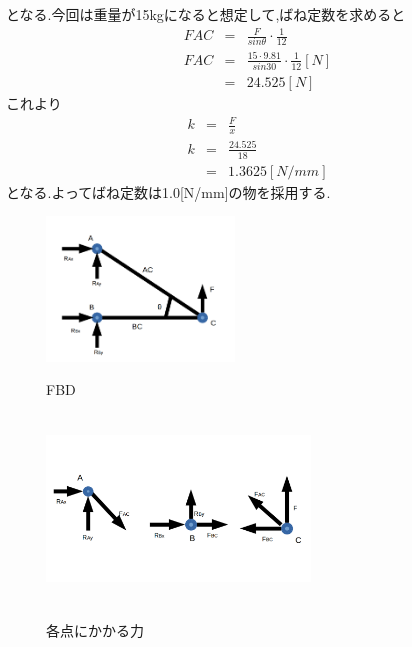 \documentclass[a4paper]{jarticle}
\begin{document}
となる.今回は重量が15kgになると想定して,ばね定数を求めると
\begin{eqnarray}
	FAC & = & \frac{F}{sinθ}\cdot \frac{1}{12} \\
	FAC & = & \frac{15 \cdot  9.81}{sin30}\cdot \frac{1}{12} [N] \\
	     & =& 24.525[N] 
\end{eqnarray}
	{これより}　
\begin{eqnarray}
	k& = &  \frac{F}{x} \\
	k& = &  \frac{24.525}{18} \\
	 & = & 1.3625 [N/mm]
\end{eqnarray}
となる.よってばね定数は1.0[N/mm]の物を採用する.

\begin{figure}[htbt]
 \begin{center}
  \includegraphics[width=50mm]{img/fig7.png}
 　\caption{FBD}
  \label{fig:fbd}%
 \end{center}
\end{figure}

\begin{figure}[htbt]
 \begin{center}
  \includegraphics[height=50mm,width=70mm]{img/fig8.png}
 　\caption{各点にかかる力}
  \label{fig:bai}%
 \end{center}
\end{figure}

\end{document}
